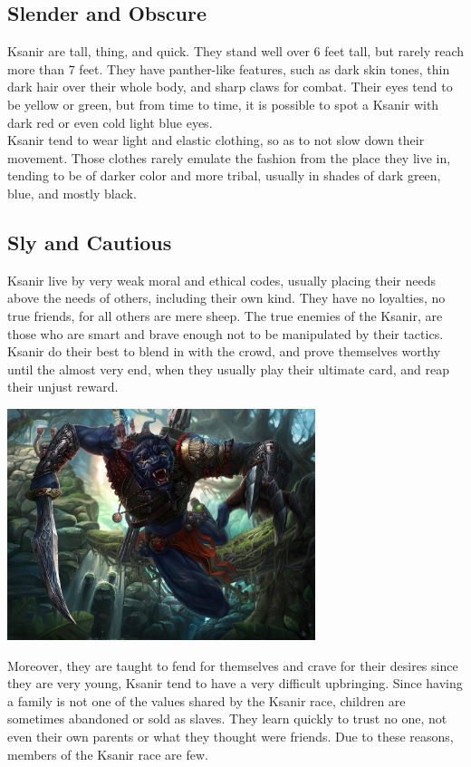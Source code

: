\documentclass[10pt,twoside,twocolumn,openany]{book}
\begin{document}
\subsection{Slender and Obscure}

Ksanir are tall, thing, and quick. They stand well over 6 feet tall, but rarely reach more than 7 feet. They have panther-like features, such as dark skin tones, thin dark hair over their whole body, and sharp claws for combat. Their eyes tend to be yellow or green, but from time to time, it is possible to spot a Ksanir with dark red or even cold light blue eyes.\\
Ksanir tend to wear light and elastic clothing, so as to not slow down their movement. Those clothes rarely emulate the fashion from the place they live in, tending to be of darker color and more tribal, usually in shades of dark green, blue, and mostly black.

\subsection{Sly and Cautious}

Ksanir live by very weak moral and ethical codes, usually placing their needs above the needs of others, including their own kind. They have no loyalties, no true friends, for all others are mere sheep. The true enemies of the Ksanir, are those who are smart and brave enough not to be manipulated by their tactics.
Ksanir do their best to blend in with the crowd, and prove themselves worthy until the almost very end, when they usually play their ultimate card, and reap their unjust reward. 
\begin{center}
	\includegraphics[width=90mm,scale=0.5]{img/ksanir.jpg}
\end{center}
\newpage
Moreover, they are taught to fend for themselves and crave for their desires since they are very young, Ksanir tend to have a very difficult upbringing. Since having a family is not one of the values shared by the Ksanir race, children are sometimes abandoned or sold as slaves. They learn quickly to trust no one, not even their own parents or what they thought were friends. Due to these reasons, members of the Ksanir race are few. \\
\end{document}
